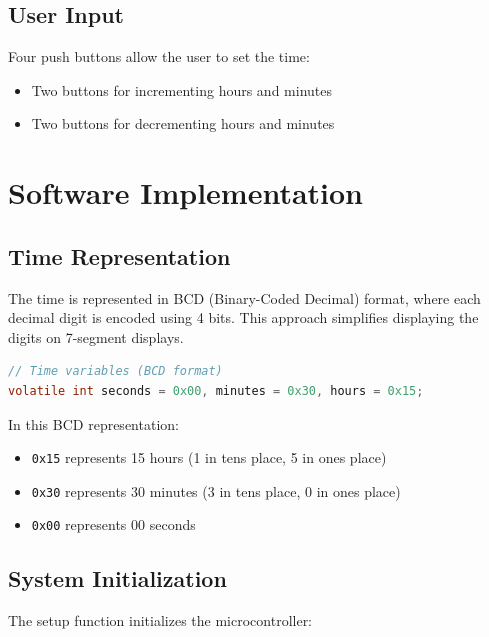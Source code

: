 \documentclass[12pt]{article}
\begin{document}
\subsection{User Input}
Four push buttons allow the user to set the time:
\begin{itemize}
    \item Two buttons for incrementing hours and minutes
    \item Two buttons for decrementing hours and minutes
\end{itemize}

\section{Software Implementation}

\subsection{Time Representation}
The time is represented in BCD (Binary-Coded Decimal) format, where each decimal digit is encoded using 4 bits. This approach simplifies displaying the digits on 7-segment displays.

\begin{lstlisting}[language=C, caption=Time Variables]
// Time variables (BCD format)
volatile int seconds = 0x00, minutes = 0x30, hours = 0x15;
\end{lstlisting}

In this BCD representation:
\begin{itemize}
    \item \texttt{0x15} represents 15 hours (1 in tens place, 5 in ones place)
    \item \texttt{0x30} represents 30 minutes (3 in tens place, 0 in ones place)
    \item \texttt{0x00} represents 00 seconds
\end{itemize}

\subsection{System Initialization}

The setup function initializes the microcontroller:
\end{document}
